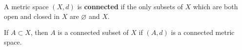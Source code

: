 A metric space $(X, d)$ is \textbf{connected} if the only subsets of $X$ which are both open and closed in $X$ are $\varnothing$ and $X$.

If $A \subset X$, then $A$ is a connected subset of $X$ if $(A, d)$ is a connected metric space.
